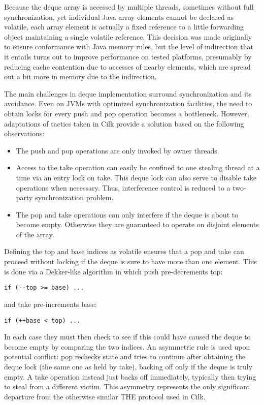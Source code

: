 Because the deque array is accessed by multiple threads, sometimes
without full synchronization, yet individual Java array elements
cannot be declared as volatile, each array element is actually a fixed
reference to a little forwarding object maintaining a single volatile
reference. This decision was made originally to ensure conformance
with Java memory rules, but the level of indirection that it entails
turns out to improve performance on tested platforms, presumably by
reducing cache contention due to accesses of nearby elements, which
are spread out a bit more in memory due to the indirection.

The main challenges in deque implementation surround synchronization
and its avoidance. Even on JVMs with optimized synchronization
facilities, the need to obtain locks for every push and pop operation
becomes a bottleneck.  However, adaptations of tactics taken in Cilk
\cite{Frigo1998} provide a solution based on the following
observations:

\begin{itemize}
\item The push and pop operations are only invoked by owner threads.
\item Access to the take operation can easily be confined to one
  stealing thread at a time via an entry lock on take. This deque lock
  can also serve to disable take operations when necessary. Thus,
  interference control is reduced to a two-party synchronization
  problem.
\item The pop and take operations can only interfere if the deque is
  about to become empty. Otherwise they are guaranteed to operate on
  disjoint elements of the array.
\end{itemize}

Defining the top and base indices as volatile ensures that a pop and
take can proceed without locking if the deque is sure to have more
than one element. This is done via a Dekker-like algorithm in which
push pre-decrements top:

\begin{lstlisting}
if (--top >= base) ...
\end{lstlisting}

and take pre-increments base:

\begin{lstlisting}
if (++base < top) ...
\end{lstlisting}

In each case they must then check to see if this could have caused the
deque to become empty by comparing the two indices. An asymmetric rule
is used upon potential conflict: pop rechecks state and tries to
continue after obtaining the deque lock (the same one as held by
take), backing off only if the deque is truly empty. A take operation
instead just backs off immediately, typically then trying to steal
from a different victim. This asymmetry represents the only
significant departure from the otherwise similar THE protocol used in
Cilk.


